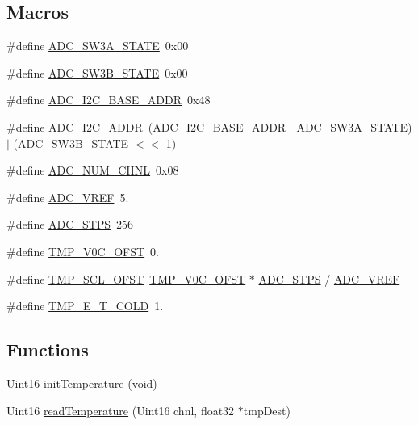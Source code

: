 \subsection*{Macros}
\begin{DoxyCompactItemize}
\item 
\#define \hyperlink{a00058_ac80e67c94bf6570094bba2248b9586f3}{A\-D\-C\-\_\-\-S\-W3\-A\-\_\-\-S\-T\-A\-T\-E}~0x00
\item 
\#define \hyperlink{a00058_a63e298aff78f6afee6ebffa60c1de62a}{A\-D\-C\-\_\-\-S\-W3\-B\-\_\-\-S\-T\-A\-T\-E}~0x00
\item 
\#define \hyperlink{a00058_a6c0e4f915b6ac0c3af9a27d604f1f7b1}{A\-D\-C\-\_\-\-I2\-C\-\_\-\-B\-A\-S\-E\-\_\-\-A\-D\-D\-R}~0x48
\item 
\#define \hyperlink{a00058_a5fd3aabe18504a5314a5d0e71e3bc495}{A\-D\-C\-\_\-\-I2\-C\-\_\-\-A\-D\-D\-R}~(\hyperlink{a00058_a6c0e4f915b6ac0c3af9a27d604f1f7b1}{A\-D\-C\-\_\-\-I2\-C\-\_\-\-B\-A\-S\-E\-\_\-\-A\-D\-D\-R} $|$ \hyperlink{a00058_ac80e67c94bf6570094bba2248b9586f3}{A\-D\-C\-\_\-\-S\-W3\-A\-\_\-\-S\-T\-A\-T\-E}) $|$ (\hyperlink{a00058_a63e298aff78f6afee6ebffa60c1de62a}{A\-D\-C\-\_\-\-S\-W3\-B\-\_\-\-S\-T\-A\-T\-E} $<$$<$ 1)
\item 
\#define \hyperlink{a00058_a448e8a52be570dfe9fdddb2045039534}{A\-D\-C\-\_\-\-N\-U\-M\-\_\-\-C\-H\-N\-L}~0x08
\item 
\#define \hyperlink{a00058_a5a03d0b939a8dda552c9fe3319a82485}{A\-D\-C\-\_\-\-V\-R\-E\-F}~5.
\item 
\#define \hyperlink{a00058_a9be6401f8c9339711816bec5ca55dd88}{A\-D\-C\-\_\-\-S\-T\-P\-S}~256
\item 
\#define \hyperlink{a00058_a6d41a70e126c748f2c99c3ff8228eb1b}{T\-M\-P\-\_\-\-V0\-C\-\_\-\-O\-F\-S\-T}~0.
\item 
\#define \hyperlink{a00058_a0f910bb108922c8686a139977510af53}{T\-M\-P\-\_\-\-S\-C\-L\-\_\-\-O\-F\-S\-T}~\hyperlink{a00058_a6d41a70e126c748f2c99c3ff8228eb1b}{T\-M\-P\-\_\-\-V0\-C\-\_\-\-O\-F\-S\-T} $\ast$ \hyperlink{a00058_a9be6401f8c9339711816bec5ca55dd88}{A\-D\-C\-\_\-\-S\-T\-P\-S} / \hyperlink{a00058_a5a03d0b939a8dda552c9fe3319a82485}{A\-D\-C\-\_\-\-V\-R\-E\-F}
\item 
\#define \hyperlink{a00058_acc66f9f90ea4746679f5d26c834ddea5}{T\-M\-P\-\_\-\-E\-\_\-\-T\-\_\-\-C\-O\-L\-D}~1.
\end{DoxyCompactItemize}
\subsection*{Functions}
\begin{DoxyCompactItemize}
\item 
Uint16 \hyperlink{a00058_a3e441d5071e094ff4f2aeb9d47f9a102}{init\-Temperature} (void)
\item 
Uint16 \hyperlink{a00058_a74292ec2fc953664dbf7be82f1656b09}{read\-Temperature} (Uint16 chnl, float32 $\ast$tmp\-Dest)
\end{DoxyCompactItemize}


